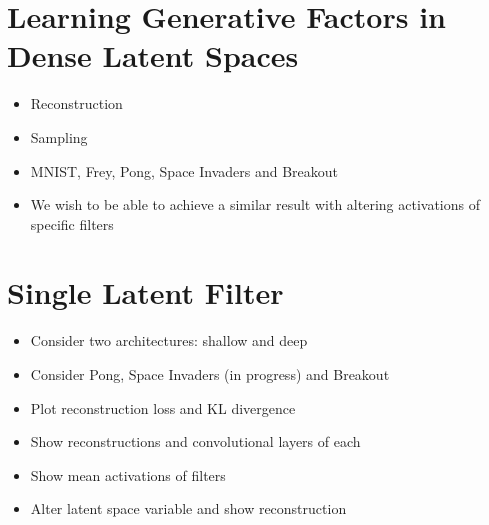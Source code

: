 %
%
%
%
%
\section{Learning Generative Factors in Dense Latent Spaces}

\begin{itemize}
\item Reconstruction 
\item Sampling
\item MNIST, Frey, Pong, Space Invaders and Breakout
\item We wish to be able to achieve a similar result with altering activations of specific filters
\end{itemize}


%
%
%
%
%
\section{Single Latent Filter}

\begin{itemize}
\item Consider two architectures: shallow and deep
\item Consider Pong, Space Invaders (in progress) and Breakout
\item Plot reconstruction loss and KL divergence
\item Show reconstructions and convolutional layers of each
\item Show mean activations of filters
\item Alter latent space variable and show reconstruction
\end{itemize}

